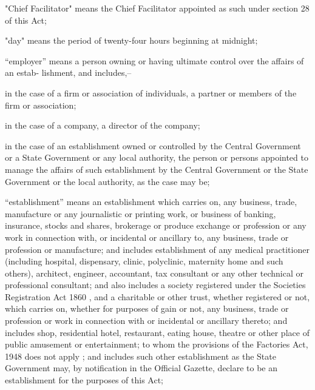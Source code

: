 \documentclass[gaz8,ordinance]{mhact}
\begin{document}
      \begin{subsectionlist}
    
    \item "Chief Facilitator" means the Chief Facilitator appointed as such 
under section 28 of this Act; 
    \item "day" means the period of twenty-four hours beginning at midnight;
    \item “employer” means a person owning or having ultimate control over the affairs of an estab- 
lishment, and includes,–
      \begin{clause}
    
    \item in the case of a firm or association of individuals, a partner or members of the firm 
or association;
    \item in the case of a company, a director of the company;
    \item in the case of an establishment owned or controlled by the Central Government or a 
State Government or any local authority, the person or persons appointed to manage 
the affairs of such establishment by the Central Government or the State Government 
or the local authority, as the case may be;
       \end{clause}
    
    \item “establishment” means an establishment which carries on, any business, trade, manufacture or any journalistic or printing work, or business of banking, insurance, stocks and 
shares, brokerage or produce exchange or profession or any work in connection with, or 
incidental or ancillary to, any business, trade or profession or manufacture; and includes 
establishment of any medical practitioner (including hospital, dispensary, clinic, polyclinic, 
maternity home and such others), architect, engineer, accountant, tax consultant or any 
other technical or professional consultant; and also includes a society registered under the 
Societies Registration Act 1860 
   , and a charitable or other trust, whether registered or not, 
which carries on, whether for purposes of gain or not, any business, trade or profession or 
work in connection with or incidental or ancillary thereto; and includes shop, residential 
hotel, restaurant, eating house, theatre or other place of public amusement or entertainment; to whom the provisions of the Factories Act, 1948 
   does not apply ; and includes such 
other establishment as the State Government may, by notification in the Official Gazette, 
declare to be an establishment for the purposes of this Act;
       \end{subsectionlist}
    
\end{document}
